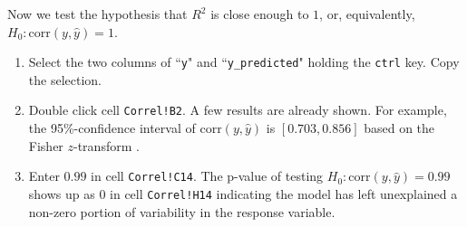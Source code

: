 \documentclass[article]{jss}
\begin{document}
        Now we test the hypothesis that $R^2$ is close enough to $1$, or, equivalently, $H_0: \textrm{corr} (y, \hat y) = 1$.
        \begin{enumerate}
          \item Select the two columns of ``\texttt{y}" and ``\texttt{y\_predicted}" holding the \texttt{ctrl} key. Copy the selection.
          \item Double click cell \texttt{Correl!B2}. 
          A few results are already shown. For example, the 95\%-confidence interval of $\textrm{corr} (y, \hat y)$ is $[0.703,0.856]$ based on the Fisher $z$-transform \citep{Fisherztransform1915}.
          \item Enter $0.99$ in  cell \texttt{Correl!C14}. The p-value of testing $H_0: \textrm{corr} (y, \hat y) = 0.99$ shows up as 0 in cell \texttt{Correl!H14} indicating the model has left unexplained a non-zero portion of variability in the response variable.
        \end{enumerate}
        
\end{document}
